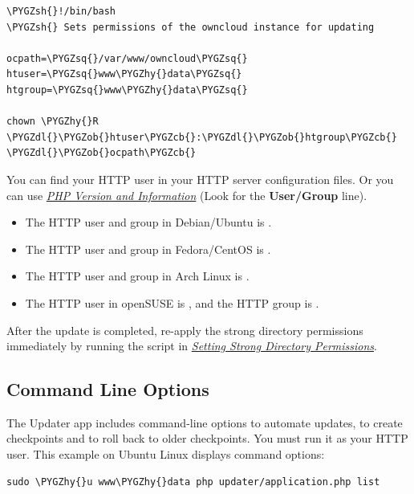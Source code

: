\documentclass[letterpaper,10pt,english]{sphinxmanual}
\def\PYGZob{\char`\{}
\def\PYGZcb{\char`\}}
\def\PYGZsh{\char`\#}
\def\PYGZdl{\char`\$}
\def\PYGZhy{\char`\-}
\def\PYGZsq{\char`\'}
\renewcommand\PYGZsq{\textquotesingle}
\begin{document}
\begin{Verbatim}[commandchars=\\\{\}]
\PYGZsh{}!/bin/bash
\PYGZsh{} Sets permissions of the owncloud instance for updating

ocpath=\PYGZsq{}/var/www/owncloud\PYGZsq{}
htuser=\PYGZsq{}www\PYGZhy{}data\PYGZsq{}
htgroup=\PYGZsq{}www\PYGZhy{}data\PYGZsq{}

chown \PYGZhy{}R \PYGZdl{}\PYGZob{}htuser\PYGZcb{}:\PYGZdl{}\PYGZob{}htgroup\PYGZcb{} \PYGZdl{}\PYGZob{}ocpath\PYGZcb{}
\end{Verbatim}

You can find your HTTP user in your HTTP server configuration files. Or you can
use {\hyperref[issues/general_troubleshooting:label\string-phpinfo]{\emph{PHP Version and Information}}} (Look for the \textbf{User/Group} line).
\begin{itemize}
\item {} 
The HTTP user and group in Debian/Ubuntu is .

\item {} 
The HTTP user and group in Fedora/CentOS is .

\item {} 
The HTTP user and group in Arch Linux is .

\item {} 
The HTTP user in openSUSE is , and the HTTP group is .

\end{itemize}

After the update is completed, re-apply the strong directory permissions
immediately by running the script in {\hyperref[installation/installation_wizard:strong\string-perms\string-label]{\emph{Setting Strong Directory Permissions}}}.


\subsection{Command Line Options}
\label{maintenance/update:updater-cli-label}\label{maintenance/update:command-line-options}
The Updater app includes command-line options to automate updates, to create
checkpoints and to roll back to older checkpoints. You must run it as your HTTP
user. This example on Ubuntu Linux displays command options:

\begin{Verbatim}[commandchars=\\\{\}]
sudo \PYGZhy{}u www\PYGZhy{}data php updater/application.php list
\end{Verbatim}
\end{document}
